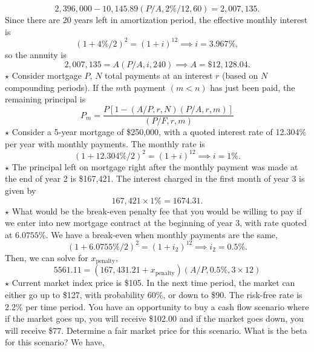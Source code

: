 \documentclass[11pt,landscape]{article}
\begin{document}
\begin{multicols*}{3}
\begin{equation*}
    2,396,000 - 10,145.89(P/A,2\%/12,60) = 2,007,135.
\end{equation*}
Since there are $20$ years left in amortization period, the effective monthly interest is 
\begin{equation*}
    (1+4\%/2)^2 = (1+i)^{12} \implies i =3.967\%,
\end{equation*}
so the annuity is 
\begin{equation*}
    2,007,135 = A(P/A,i,240) \implies A = \$12,128.04.
\end{equation*}
$\star$ Consider mortgage $P$, $N$ total payments at an interest $r$ (based on $N$ compounding periods). If the $m$th payment $(m<n)$ has just been paid, the remaining principal is
\begin{equation*}
    P_m = \frac{P\left[1-(A/P,r,N)(P/A,r,m)\right]}{(P/F,r,m)}
\end{equation*}
$\star$ Consider a 5-year mortgage of \$250,000, with a quoted interest rate of 12.304\% per year with monthly payments. The monthly rate is 
\begin{equation*}
    (1+12.304\%/2)^2 = (1+i)^{12} \implies i = 1\%.
\end{equation*}
$\star$ The principal left on mortgage right after the monthly payment was made at the end of year 2 is \$167,421. The interest charged in the first month of year 3 is given by
\begin{equation*}
    167,421 \times 1\% = 1674.31.
\end{equation*}
$\star$ What would be the break-even penalty fee that you would be willing to pay if we enter into new mortgage contract at the beginning of year 3, with rate quoted at $6.0755\%.$ We have a break-even when monthly payments are the same,
\begin{equation*}
    (1+6.0755\%/2)^2 = (1+i_2)^{12} \implies i_2 = 0.5\%.
\end{equation*}
Then, we can solve for $x_\text{penalty},$
\begin{equation*}
    5561.11 = (167,431.21 + x_\text{penalty})(A/P, 0.5\%, 3\times 12)
\end{equation*}
$\star$ Current market index price is \$105. In the next time period, the market can either go up to \$127, with probability 60\%, or down to \$90. The risk-free rate is 2.2\% per time
period. You have an opportunity to buy a cash flow scenario where if the market goes
up, you will receive \$102.00 and if the market goes down, you will receive \$77.
Determine a fair market price for this scenario. What is the beta for this scenario? We have,

\end{multicols*}
\end{document}
